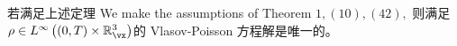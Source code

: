 

\begin{theorem}
\citet*{1991InMat.105..415L} 若满足上述定理 
We make the assumptions of Theorem $1,(10),(42),$ 则满足 $\rho \in L^{\infty}\left((0, T) \times \mathbb{R}_{\vx}^{3}\right)$的 Vlasov-Poisson 方程解是唯一的。
\end{theorem}




